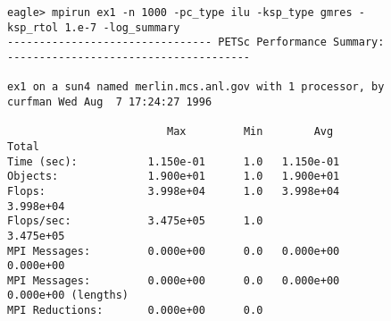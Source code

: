 \begin{figure}[H]
{\footnotesize
\begin{verbatim}
eagle> mpirun ex1 -n 1000 -pc_type ilu -ksp_type gmres -ksp_rtol 1.e-7 -log_summary
-------------------------------- PETSc Performance Summary: --------------------------------------

ex1 on a sun4 named merlin.mcs.anl.gov with 1 processor, by curfman Wed Aug  7 17:24:27 1996

                         Max         Min        Avg        Total 
Time (sec):           1.150e-01      1.0   1.150e-01
Objects:              1.900e+01      1.0   1.900e+01
Flops:                3.998e+04      1.0   3.998e+04  3.998e+04
Flops/sec:            3.475e+05      1.0              3.475e+05
MPI Messages:         0.000e+00      0.0   0.000e+00  0.000e+00
MPI Messages:         0.000e+00      0.0   0.000e+00  0.000e+00 (lengths)
MPI Reductions:       0.000e+00      0.0


\end{verbatim}}
\end{figure}
